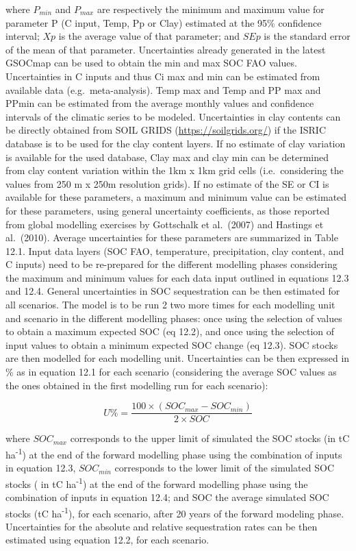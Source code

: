 \documentclass[
  10pt,
  b5paper,
]{book}
\begin{document}
where \(P_{min}\) and \(P_{max}\) are respectively the minimum and maximum value for parameter P (C input, Temp, Pp or Clay) estimated at the 95\% confidence interval; \(Xp\) is the average value of that parameter; and \(SEp\) is the standard error of the mean of that parameter.
Uncertainties already generated in the latest GSOCmap can be used to obtain the min and max SOC FAO values. Uncertainties in C inputs and thus Ci max and min can be estimated from available data (e.g.~meta-analysis). Temp max and Temp and PP max and PPmin can be estimated from the average monthly values and confidence intervals of the climatic series to be modeled. Uncertainties in clay contents can be directly obtained from SOIL GRIDS (\url{https://soilgrids.org/}) if the ISRIC database is to be used for the clay content layers. If no estimate of clay variation is available for the used database, Clay max and clay min can be determined from clay content variation within the 1km x 1km grid cells (i.e.~considering the values from 250 m x 250m resolution grids).
If no estimate of the SE or CI is available for these parameters, a maximum and minimum value can be estimated for these parameters, using general uncertainty coefficients, as those reported from global modelling exercises by Gottschalk et al.~(2007) and Hastings et al.~(2010). Average uncertainties for these parameters are summarized in Table 12.1.
Input data layers (SOC FAO, temperature, precipitation, clay content, and C inputs) need to be re-prepared for the different modelling phases considering the maximum and minimum values for each data input outlined in equations 12.3 and 12.4.
General uncertainties in SOC sequestration can be then estimated for all scenarios. The model is to be run 2 two more times for each modelling unit and scenario in the different modelling phases: once using the selection of values to obtain a maximum expected SOC (eq 12.2), and once using the selection of input values to obtain a minimum expected SOC change (eq 12.3). SOC stocks are then modelled for each modelling unit. Uncertainties can be then expressed in \% as in equation 12.1 for each scenario (considering the average SOC values as the ones obtained in the first modelling run for each scenario):

\begin{equation}
\tag{12.7}
U \%=\frac{100 \times (SOC_{max} - SOC_{min})}{2 \times SOC}    
\end{equation}

where \(SOC_{max}\) corresponds to the upper limit of simulated the SOC stocks (in tC ha\textsuperscript{-1}) at the end of the forward modelling phase using the combination of inputs in equation 12.3, \(SOC_{min}\) corresponds to the lower limit of the simulated SOC stocks ( in tC ha\textsuperscript{-1}) at the end of the forward modelling phase using the combination of inputs in equation 12.4; and SOC the average simulated SOC stocks (tC ha\textsuperscript{-1}), for each scenario, after 20 years of the forward modeling phase. Uncertainties for the absolute and relative sequestration rates can be then estimated using equation 12.2, for each scenario.
\end{document}
